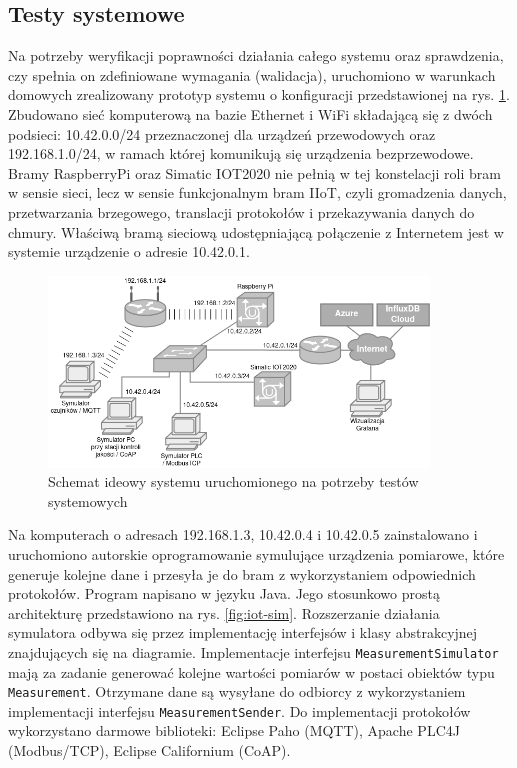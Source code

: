 \documentclass[a4paper, 12pt, twoside]{article}
\begin{document}
\subsection{Testy systemowe}\label{testy-systemowe}

Na potrzeby weryfikacji poprawności działania całego systemu oraz sprawdzenia,
czy spełnia on zdefiniowane wymagania (walidacja), uruchomiono w warunkach
domowych zrealizowany prototyp systemu o konfiguracji przedstawionej na rys. \ref{fig:network}.
Zbudowano sieć komputerową na bazie Ethernet i WiFi składającą się z dwóch
podsieci: 10.42.0.0/24 przeznaczonej dla urządzeń przewodowych oraz
192.168.1.0/24, w ramach której komunikują się urządzenia bezprzewodowe.
Bramy RaspberryPi oraz Simatic IOT2020 nie pełnią w tej konstelacji roli
bram w sensie sieci, lecz w sensie funkcjonalnym bram IIoT, czyli gromadzenia danych, przetwarzania
brzegowego, translacji protokołów i przekazywania danych do chmury.
Właściwą bramą sieciową udostępniającą połączenie z Internetem jest w systemie urządzenie o adresie 10.42.0.1.

\begin{figure}[h]
      \centering
      \includegraphics[width=0.9\textwidth]{network.png}
      \caption{Schemat ideowy systemu uruchomionego na potrzeby testów systemowych}
      \label{fig:network}
\end{figure}

Na komputerach o adresach 192.168.1.3, 10.42.0.4 i 10.42.0.5 zainstalowano i uruchomiono
autorskie oprogramowanie symulujące urządzenia pomiarowe, które generuje kolejne dane
i przesyła je do bram z wykorzystaniem odpowiednich protokołów. Program napisano
w języku Java. Jego stosunkowo prostą architekturę przedstawiono na rys. \ref{fig:iot-sim}.
Rozszerzanie działania symulatora odbywa się przez implementację interfejsów
i klasy abstrakcyjnej znajdujących się na diagramie. Implementacje interfejsu \texttt{MeasurementSimulator}
mają za zadanie generować kolejne wartości pomiarów w postaci obiektów typu
\texttt{Measurement}. Otrzymane dane są wysyłane do odbiorcy z wykorzystaniem implementacji
interfejsu \texttt{MeasurementSender}. Do implementacji protokołów wykorzystano
darmowe biblioteki: Eclipse Paho (MQTT), Apache PLC4J (Modbus/TCP), Eclipse Californium (CoAP).
\end{document}
